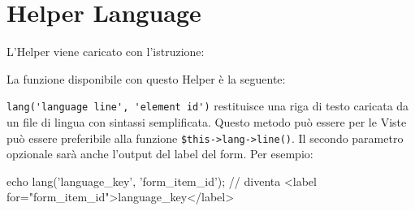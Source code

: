 \section{Helper Language}
\label{helper:language}

L'Helper viene caricato con l'istruzione:


La funzione disponibile con questo Helper è la seguente:

\verb|lang('language line', 'element id')| restituisce una riga di testo caricata da un file di lingua  con sintassi semplificata. Questo metodo può essere per le Viste può essere preferibile alla funzione \verb|$this->lang->line()|. Il secondo parametro opzionale sarà anche l'output del label del form. Per esempio:

\begin{code}
echo lang('language_key', 'form_item_id');
// diventa <label for="form_item_id">language_key</label>
\end{code}